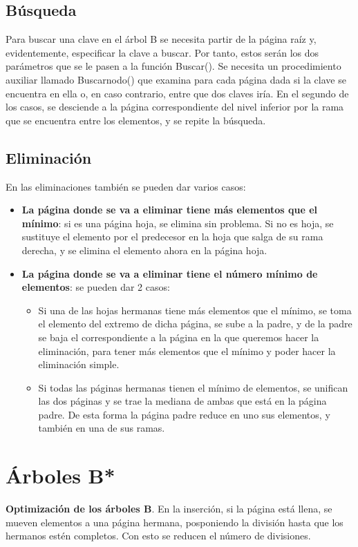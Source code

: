\documentclass{article}
\begin{document}
\subsection{Búsqueda}
Para buscar una clave en el árbol B se necesita partir de la página raíz y, evidentemente,
especificar la clave a buscar. Por tanto, estos serán los dos parámetros que se le pasen a la
función Buscar(). Se necesita un procedimiento auxiliar llamado Buscarnodo() que examina
para cada página dada si la clave se encuentra en ella o, en caso contrario, entre que dos claves
iría. En el segundo de los casos, se desciende a la página correspondiente del nivel inferior por
la rama que se encuentra entre los elementos, y se repite la búsqueda.

\newpage

\subsection{Eliminación}
En las eliminaciones también se pueden dar varios casos:
\begin{itemize}
    \item \textbf{La página donde se va a eliminar tiene más elementos que el mínimo}: si es una página hoja, se elimina sin problema. Si no es hoja, se sustituye el elemento por el predecesor en la hoja que salga de su rama derecha, y se elimina el elemento ahora en la página hoja.

    \item \textbf{La página donde se va a eliminar tiene el número mínimo de elementos}: se pueden dar 2 casos:
        \begin{itemize}
            \item Si una de las hojas hermanas tiene más elementos que el mínimo, se toma el elemento del extremo de dicha página, se sube a la padre, y de la padre se baja el correspondiente a la página en la que queremos hacer la eliminación, para tener más elementos que el mínimo y poder hacer la eliminación simple.

            \item Si todas las páginas hermanas tienen el mínimo de elementos, se unifican las dos páginas y se trae la mediana de ambas que está en la página padre. De esta forma la página padre reduce en uno sus elementos, y también en una de sus ramas.
        \end{itemize}
\end{itemize}

\section{Árboles B*}
\textbf{Optimización de los árboles B}. En la inserción, si la página está llena, se mueven elementos a una página hermana, posponiendo la división hasta que los hermanos estén completos. Con esto se reducen el número de divisiones.
\end{document}
